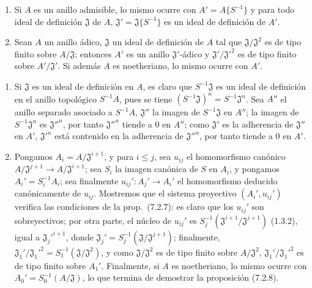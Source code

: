 \begin{proposition}[7.6.11]
\label{0.7.6.11-fr}
\begin{enumerate}
  \item[\rm(i)] Si $A$ es un anillo admisible, lo mismo ocurre con
    $A'=A\{S^{-1}\}$ y para todo ideal de definición $\mathfrak J$ de $A$,
    $\mathfrak J'=\mathfrak J\{S^{-1}\}$ es un ideal de definición de $A'$.
  \item[\rm(ii)] Sean $A$ un anillo ádico, $\mathfrak J$ un ideal de
    definición de $A$ tal que $\mathfrak J/\mathfrak J^2$ es de tipo finito
    sobre $A/\mathfrak J$; entonces $A'$ es un anillo $\mathfrak J'$-ádico y
    $\mathfrak J'/\mathfrak J'^2$ es de tipo finito sobre
    $A'/\mathfrak J'$. Si además $A$ es noetheriano, lo mismo ocurre con
    $A'$.
\end{enumerate}
\end{proposition}

\begin{enumerate}
  \item[\rm(i)] Si $\mathfrak J$ es un ideal de definición en $A$, es
    claro que $S^{-1}\mathfrak J$ es un ideal de definición en el anillo
    topológico $S^{-1}A$, pues se tiene
    $(S^{-1}\mathfrak J)^n=S^{-1}\mathfrak J^n$. Sea $A''$ el anillo separado
    asociado a $S^{-1}A$, $\mathfrak J''$ la imagen de $S^{-1}\mathfrak J$ en
    $A''$; la imagen de $S^{-1}\mathfrak J^n$ es $\mathfrak J''^n$, por tanto
    $\mathfrak J''^n$ tiende a 0 en $A''$; como $\mathfrak J'$ es
    la adherencia de $\mathfrak J''$ en $A'$, $\mathfrak J'^n$ está contenido
    en la adherencia de $\mathfrak J''^n$, por tanto tiende a 0 en $A'$.
  \item[\rm(ii)] Pongamos $A_i=A/\mathfrak J^{i+1}$, y para $i\leq j$, sea
    $u_{ij}$ el homomorfismo canónico
    $A/\mathfrak J^{j+1}\to A/\mathfrak J^{i+1}$; sea $S_i$ la imagen
    canónica de $S$ en $A_i$, y pongamos $A_i'=S_i^{-1}A_i$; sea finalmente
    $u_{ij}':A_j'\to A_i'$ el homomorfismo deducido canónicamente de $u_{ij}$.
    Mostremos que el sistema proyectivo $(A_i',u_{ij}')$ verifica las condiciones
    de la prop.~(7.2.7): es claro que los $u_{ij}'$ son sobreyectivos;
    por otra parte, el núcleo de $u_{ij}'$ es
    $S_j^{-1}(\mathfrak J^{i+1}/\mathfrak J^{j+1})$ (1.3.2), igual a
    $\mathfrak J_j'^{i+1}$, donde
    $\mathfrak J_j'=S_j^{-1}(\mathfrak J/\mathfrak J^{j+1})$; finalmente,
    $\mathfrak J_1'/\mathfrak J_1'^2=S_1^{-1}(\mathfrak J/\mathfrak J^2)$,
    y como $\mathfrak J/\mathfrak J^2$ es de tipo finito sobre
    $A/\mathfrak J^2$, $\mathfrak J_1'/\mathfrak J_1'^2$ es de tipo finito
    sobre $A_1'$. Finalmente, si $A$ es noetheriano, lo mismo ocurre con
    $A_0'=S_0^{-1}(A/\mathfrak J)$, lo que termina de demostrar la proposición
    (7.2.8).
\end{enumerate}

